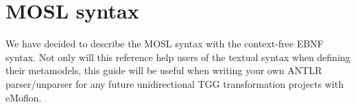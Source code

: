 \newpage
\section{MOSL syntax}
\genHeader

We have decided to describe the MOSL syntax with the context-free EBNF syntax. Not only will this reference help users of the textual syntax when defining their
metamodels, this guide will be useful when writing your own ANTLR parser/unparser for any future unidirectional TGG transformation projects with
eMoflon.
